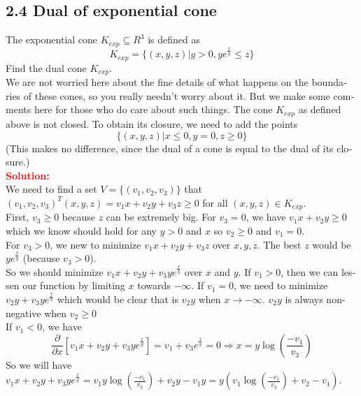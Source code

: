 \documentclass[a4paper]{article}
\begin{document}
\begin{latin}
\section{2.4 Dual of exponential cone}
The exponential cone $ K_{exp} \subseteq R^{3}  $ is defined as
\begin{equation*}
	 K_{exp} = \{(x, y, z) | y > 0, ye^{\frac{x}{y}} \leq z \}
\end{equation*}
Find the dual cone $ K_{exp} $.
\\
We are not worried here about the fine details of what happens on the boundaries of these cones, so you really needn’t worry about it. But we make some comments here for those who do care about such things.
The cone $ K_{exp} $ as defined above is not closed. To obtain its closure, we need to add the points
\begin{equation*}
	\{(x, y, z) | x \leq 0, y = 0, z \geq 0\}
\end{equation*}
(This makes no difference, since the dual of a cone is equal to the dual of its closure.)
\\
\textcolor{red}{\textbf{Solution:}}
\\
We need to find a set $ V = \{(v_{1},v_{2},v_{3})\} $ that $ (v_{1},v_{2},v_{3})^{T} (x, y, z) = v_{1}x + v_{2}y + v_{3}z \geq 0 $ for all $ (x, y, z) \in K_{exp} $.
\\
First, $ v_{3} \geq 0 $ because $ z $ can be extremely big. For $ v_{3} = 0 $, we have $ v_{1}x + v_{2}y \geq 0 $ which we know should hold for any $ y>0 $ and $ x $ so $ v_{2} \geq 0 $ and $ v_{1} = 0 $.
\\
For $ v_{3} > 0 $, we new to minimize $ v_{1}x + v_{2}y + v_{3}z $ over $ x,y,z $. The best $ z $ would be $ ye^{\frac{x}{y}} $ (because  $ v_{3} > 0 $).
\\
So we should minimize $ v_{1}x + v_{2}y + v_{3}ye^{\frac{x}{y}} $ over $ x $ and $ y $. If $ v_{1} > 0 $, then we can lessen our function by limiting $ x $ towards $ - \infty $. If $ v_{1} = 0 $, we need to minimize $ v_{2}y + v_{3}ye^{\frac{x}{y}} $ which would be clear that is $ v_{2}y $ when $ x \to -\infty $. $ v_{2}y $ is always non-negative when  $ v_{2} \geq 0 $
\\
If $ v_{1} < 0 $, we have
\begin{equation*}
	\frac{\partial }{\partial x} [v_{1}x + v_{2}y + v_{3}ye^{\frac{x}{y}}] = v_{1} + v_{3} e^{\frac{x}{y}} = 0 \Rightarrow x = y \log(\frac{-v_{1}}{v_{3}})
\end{equation*}
So we will have $ v_{1}x + v_{2}y + v_{3}ye^{\frac{x}{y}} = v_{1} y \log(\frac{-v_{1}}{v_{3}}) + v_{2} y - v_{1}y = y(v_{1}\log(\frac{-v_{1}}{v_{3}}) + v_{2} - v_{1}) $.

\end{latin}
\end{document}
